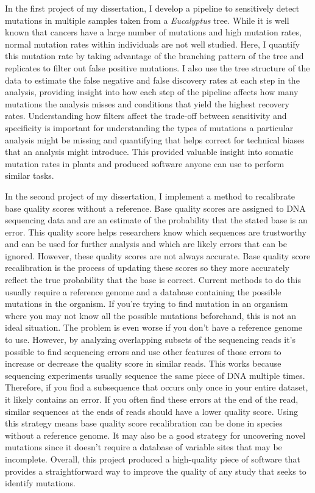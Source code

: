 \documentclass{article}
\begin{document}
In the first project of my dissertation, I develop a pipeline to sensitively detect mutations in multiple samples taken from a \textit{Eucalyptus} tree.
While it is well known that cancers have a large number of mutations and high mutation rates, normal mutation rates within individuals are not well studied.
Here, I quantify this mutation rate by taking advantage of the branching pattern of the tree and replicates to filter out false positive mutations.
I also use the tree structure of the data to estimate the false negative and false discovery rates at each step in the analysis, providing insight into how each
step of the pipeline affects how many mutations the analysis misses and conditions that yield the highest recovery rates.
Understanding how filters affect the trade-off between sensitivity and specificity is important for understanding the types of mutations a particular analysis might be missing and quantifying that helps correct for technical biases that an analysis might introduce.
This provided valuable insight into somatic mutation rates in plants and produced software anyone can use to perform similar tasks.

In the second project of my dissertation, I implement a method to recalibrate base quality scores without a reference.
Base quality scores are assigned to DNA sequencing data and are an estimate of the probability that the stated base is an error.
This quality score helps researchers know which sequences are trustworthy and can be used for further analysis and which are likely errors that can be ignored.
However, these quality scores are not always accurate.
Base quality score recalibration is the process of updating these scores so they more accurately reflect the true probability that the base is correct.
Current methods to do this usually require a reference genome and a database containing the possible mutations in the organism.
If you're trying to find mutation in an organism where you may not know all the possible mutations beforehand, this is not an ideal situation.
The problem is even worse if you don't have a reference genome to use.
However, by analyzing overlapping subsets of the sequencing reads it's possible to find sequencing errors and use other features of those errors to increase or decrease the quality score in similar reads.
This works because sequencing experiments usually sequence the same piece of DNA multiple times.
Therefore, if you find a subsequence that occurs only once in your entire dataset, it likely contains an error.
If you often find these errors at the end of the read, similar sequences at the ends of reads should have a lower quality score.
Using this strategy means base quality score recalibration can be done in species without a reference genome.
It may also be a good strategy for uncovering novel mutations since it doesn't require a database of variable sites that may be incomplete.
Overall, this project produced a high-quality piece of software that provides a straightforward way to improve the quality of any study that seeks to identify mutations.
\end{document}
